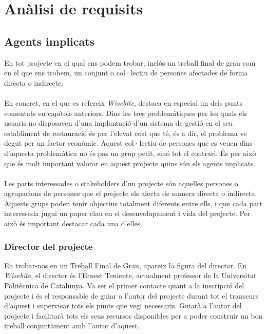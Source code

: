 
\chapter{Anàlisi de requisits} %

\label{Chapter4} %


\section{Agents implicats}
En tot projecte en el qual ens podem trobar, inclòs un treball final de grau com en el que ens trobem, un conjunt o col·lectiu de persones afectades de forma directa o indirecte.
\\\\
En concret, en el que es refereix \textit{Wisebite}, destaca en especial un dels punts comentats en capítols anteriors. Dins les tres problemàtiques per les quals els usuaris no disposaven d'una implantació d'un sistema de gestió en el seu establiment de restauració és per l'elevat cost que té, és a dir, el problema ve degut per un factor econòmic. Aquest col·lectiu de persones que es veuen dins d'aquesta problemàtica no és pas un grup petit, sinó tot el contrari. És per això que és molt important valorar en aquest projecte quins són els agents implicats.
\\\\
Les parts interessades o stakeholders\cite{stakeholder} d'un projecte són aquelles persones o agrupacions de persones que el projecte els afecta de manera directa o indirecta. Aquests grups poden tenir objectius totalment diferents entre ells, i que cada part interessada jugui un paper clau en el desenvolupament i vida del projecte. Per això és important destacar cada una d'elles.

\subsection{Director del projecte}
En trobar-nos en un Treball Final de Grau, apareix la figura del director. En \textit{Wisebite}, el director és l'Ernest Teniente\cite{ernestteniente}, actualment professor de la Universitat Politècnica de Catalunya. Va ser el primer contacte quant a la inscripció del projecte i és el responsable de guiar a l'autor del projecte durant tot el transcurs d'aquest i supervisar tots els punts que vegi necessaris. Guiarà a l'autor del projecte i facilitarà tots els seus recursos disponibles per a poder construir un bon treball conjuntament amb l'autor d'aquest.

